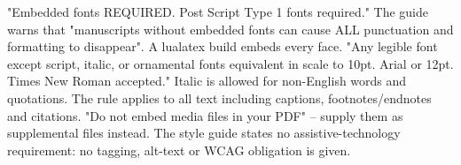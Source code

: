 %
%




	{"Embedded fonts REQUIRED. Post Script Type 1 fonts required." The guide
	 warns that "manuscripts without embedded fonts can cause ALL punctuation
	 and formatting to disappear". A lualatex build embeds every face.}
	{"Any legible font except script, italic, or ornamental fonts equivalent in
	 scale to 10pt. Arial or 12pt. Times New Roman accepted." Italic is allowed
	 for non-English words and quotations. The rule applies to all text
	 including captions, footnotes/endnotes and citations.}
	{"Do not embed media files in your PDF" -- supply them as supplemental
	 files instead.}
	{The style guide states no assistive-technology requirement: no tagging,
	 alt-text or WCAG obligation is given.}
